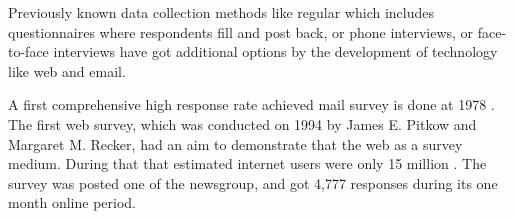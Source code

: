 Previously known data collection methods like regular which includes questionnaires where respondents fill and post back, or phone interviews, or face-to-face interviews have got additional options by the development of technology like web and email.
\vspace{1cm}

A first comprehensive high response rate achieved mail survey is done at 1978 \cite[page 3]{Dillman2006}.
The first web survey, which was conducted on 1994 by James E. Pitkow and Margaret M. Recker, had an aim to demonstrate that the web as a survey medium. During that that estimated internet users were only 15 million \cite{Lewis1993}. The survey was posted one of the newsgroup, and got 4,777 responses during its one month online period.

